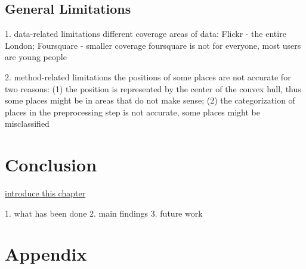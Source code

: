 \documentclass{article}
\theoremstyle{remark}
\begin{document}








\subsection{General Limitations} \label{limitations}
1. data-related limitations
different coverage areas of data: Flickr - the entire London; Foursquare - smaller coverage
foursquare is not for everyone, most users are young people

2. method-related limitations
the positions of some places are not accurate for two reasons: (1) the position is represented by the center of the convex hull, thus some places might be in areas that do not make sense; (2) the categorization of places in the preprocessing step is not accurate, some places might be misclassified


\clearpage


\section{Conclusion}
\underline{introduce this chapter}

1. what has been done
2. main findings
3. future work


\clearpage






\clearpage


\appendix
\section{Appendix} \label{appendix}
\end{document}
